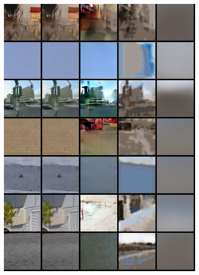 \begin{appendices}
\begin{figure}
    \centering
    \includegraphics[width=0.92\textwidth]{figures/ptz/test_stacked_0}
\end{figure}
\begin{figure}
    \centering

\end{figure}
\end{appendices}
